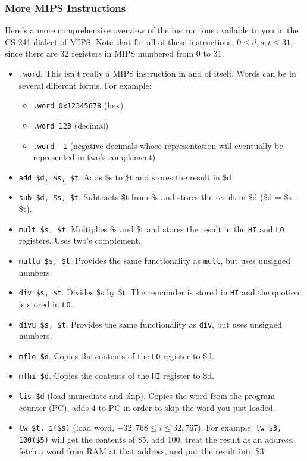\documentclass[]{article}
\theoremstyle{definition}
\begin{document}
		\subsubsection{More MIPS Instructions}
			Here's a more comprehensive overview of the instructions available to you in the CS 241 dialect of MIPS. Note that for all of these instructions, $0 \le d, s, t \le 31$, since there are 32 registers in MIPS numbered from 0 to 31.
			\begin{itemize}
				\item \verb+.word+. This isn't really a MIPS instruction in and of itself. Words can be in several different forms. For example:
					\begin{itemize}
						\item \verb+.word 0x12345678+ (hex)
						\item \verb+.word 123+ (decimal)
						\item \verb+.word -1+ (negative decimals whose representation will eventually be represented in two's complement)
					\end{itemize}
				\item \verb+add $d, $s, $t+. Adds \$s to \$t and stores the result in \$d.
				\item \verb+sub $d, $s, $t+. Subtracts \$t from \$s and stores the result in \$d (\$d = \$s - \$t).
				\item \verb+mult $s, $t+. Multiplies \$s and \$t and stores the result in the \verb+HI+ and \verb+LO+ registers. Uses two's complement.
				\item \verb+multu $s, $t+. Provides the same functionality as \verb+mult+, but uses unsigned numbers.
				\item \verb+div $s, $t+. Divides \$s by \$t. The remainder is stored in \verb+HI+ and the quotient is stored in \verb+LO+.
				\item \verb+divu $s, $t+. Provides the same functionality as \verb+div+, but uses unsigned numbers.
				\item \verb+mflo $d+. Copies the contents of the \verb+LO+ register to \$d.
				\item \verb+mfhi $d+. Copies the contents of the \verb+HI+ register to \$d.
				\item \verb+lis $d+ (load immediate and skip). Copies the word from the program counter (PC), adds 4 to PC in order to skip the word you just loaded.
				\item \verb+lw $t, i($s)+ (load word, $-32,768 \le i \le 32,767$). For example: \verb+lw $3, 100($5)+ will get the contents of \$5, add 100, treat the result as an address, fetch a word from RAM at that address, and put the result into \$3.

\end{itemize}
\end{document}
